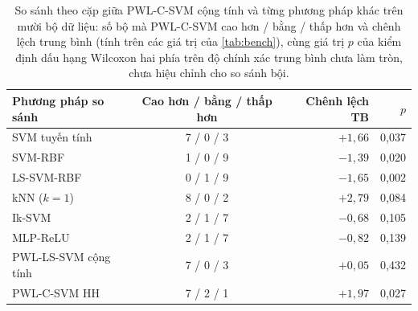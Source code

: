\begin{table}[t]
\centering
\caption[So sánh theo cặp với PWL-C-SVM cộng tính]{So sánh theo cặp giữa PWL-C-SVM cộng tính và từng phương pháp khác trên mười bộ dữ liệu: số bộ mà PWL-C-SVM cao hơn / bằng / thấp hơn và chênh lệch trung bình (tính trên các giá trị của \cref{tab:bench}), cùng giá trị $p$ của kiểm định dấu hạng Wilcoxon hai phía trên độ chính xác trung bình chưa làm tròn, chưa hiệu chỉnh cho so sánh bội.}
\label{tab:wilcoxon}
\small
\renewcommand{\arraystretch}{1.18}
\begin{tabular}{@{}l c r r@{}}
\toprule
\textbf{Phương pháp so sánh} & \textbf{Cao hơn / bằng / thấp hơn} & \textbf{Chênh lệch TB} & $p$\\
\midrule
SVM tuyến tính & 7 / 0 / 3 & $+1{,}66$ & 0{,}037\\
SVM-RBF & 1 / 0 / 9 & $-1{,}39$ & 0{,}020\\
LS-SVM-RBF & 0 / 1 / 9 & $-1{,}65$ & 0{,}002\\
kNN ($k=1$) & 8 / 0 / 2 & $+2{,}79$ & 0{,}084\\
Ik-SVM & 2 / 1 / 7 & $-0{,}68$ & 0{,}105\\
MLP-ReLU & 2 / 1 / 7 & $-0{,}82$ & 0{,}139\\
PWL-LS-SVM cộng tính & 7 / 0 / 3 & $+0{,}05$ & 0{,}432\\
PWL-C-SVM HH & 7 / 2 / 1 & $+1{,}97$ & 0{,}027\\
\bottomrule
\end{tabular}
\end{table}
